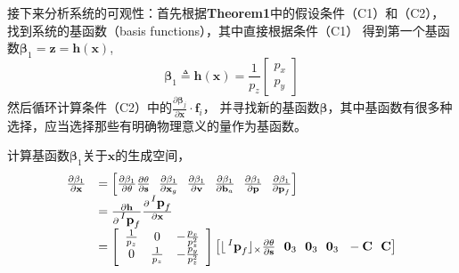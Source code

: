 \documentclass{article}
\begin{document}
\par
接下来分析系统的可观性：首先根据\textbf{Theorem1}中的假设条件（C1）和（C2），找到系统的基函数（basis functions），其中直接根据条件（C1）
得到第一个基函数$\mathbf{\beta}_{1}=\textbf{z}=\textbf{h}(\textbf{x})$,
\begin{equation}
    \mathbf{\beta}_{1}\triangleq \textbf{h}(\textbf{x})=\frac{1}{p_z}
    \left[\begin{array}{c} p_x\\p_y \end{array}\right]
\end{equation}
然后循环计算条件（C2）中的$\frac{\partial\mathbf{\beta}_j}{\partial\textbf{x}}\cdot\textbf{f}_{i}$，
并寻找新的基函数$\mathbf{\beta}$，其中基函数有很多种选择，应当选择那些有明确物理意义的量作为基函数。
\par
计算基函数$\mathbf{\beta}_1$关于$\textbf{x}$的生成空间，
\begin{equation}
    \begin{array}{ll}\frac{\partial\mathbf{\beta}_1}{\partial\textbf{x}}
        &=\left[\frac{\partial\mathbf{\beta}_1}{\partial\mathbf{\theta}}\frac{\partial\mathbf{\theta}}{\partial\textbf{s}}
        \ \ \frac{\partial\mathbf{\beta}_1}{\partial\textbf{x}_{g}}\ \ \frac{\partial\mathbf{\beta}_1}{\partial\textbf{v}}
        \ \ \frac{\partial\mathbf{\beta}_1}{\partial\textbf{b}_{a}}\ \ \frac{\partial\mathbf{\beta}_1}{\partial\textbf{p}}
        \ \ \frac{\partial\mathbf{\beta}_1}{\partial\textbf{p}_f}\right]\\
        &=\frac{\partial\textbf{h}}{\partial\sideset{^I}{}{\mathop{\textbf{p}_{f}}}}
        \frac{\partial\sideset{^I}{}{\mathop{\textbf{p}_{f}}}}{\partial\textbf{x}}\\
        &=\left[\begin{array}{ccc}
            \frac{1}{p_z} &0 &-\frac{p_x}{p_z^2}\\
            0 &\frac{1}{p_z} &-\frac{p_y}{p_z^2}\end{array}\right]
            \left[\lfloor\sideset{^I}{}{\mathop{\textbf{p}_{f}}}\rfloor_{\times}\frac{\partial\mathbf{\theta}}{\partial\textbf{s}}
            \ \ \textbf{0}_3\ \ \textbf{0}_3\ \ \textbf{0}_3\ \ -\textbf{C}\ \ \textbf{C}
            \right]
    \end{array}
\end{equation}
\end{document}
